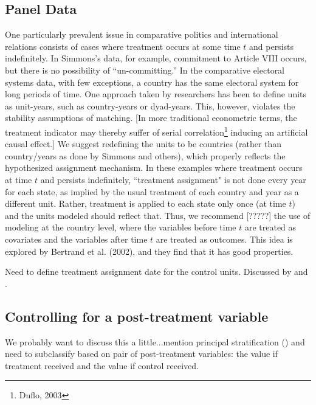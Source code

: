 \documentclass[11pt,titlepage]{article}
\begin{document}
\subsection{Panel Data}
 One particularly prevalent issue
  in comparative politics and international relations consists of
  cases where treatment occurs at some time $t$ and persists
  indefinitely.  In Simmons's data, for example, commitment to Article VIII occurs,
  but there is no possibility of ``un-committing.''  In the
  comparative electoral systems data, with few exceptions, a country
  has the same electoral system for long periods of time.  One
  approach taken by researchers has been to define units as
  unit-years, such as country-years or dyad-years.  This, however, violates the
  stability assumptions of matching. 
  [In more traditional econometric terms, the treatment indicator may
  thereby suffer of serial
  correlation\footnote{Duflo, 2003} inducing an artificial causal
  effect.] We suggest redefining the units to be countries (rather than country/years as done by Simmons and others),
which properly reflects the hypothesized assignment mechanism.  In these examples where treatment occurs at time $t$
and persists indefinitely, ``treatment assignment" is not done every year for each state, as implied by the usual
treatment of each country and year as a different unit.  Rather, treatment is applied to each state only once (at time
$t$) and the units modeled should reflect that.  Thus, we recommend [?????] the use of modeling at the country level, 
where
the variables before time $t$ are treated as covariates and the variables after time $t$ are treated as outcomes.  
This idea is explored by Bertrand et al. (2002), and they find that it has good properties. 

Need to define treatment assignment date for the control units.  Discussed by \cite{Rubin91} and \cite{Sianesi04}.

\subsection{Controlling for a post-treatment variable}
We probably want to discuss this a little...mention principal stratification (\cite{FraRub02}) and need to subclassify based on pair of post-treatment
variables: the value if treatment received and the value if control received.  
                                                                                                                                                             
\end{document}
